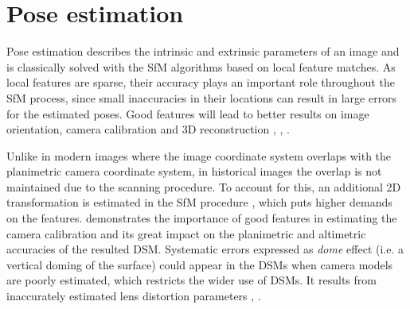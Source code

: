 \section{Pose estimation}
Pose estimation describes the intrinsic and extrinsic parameters of an image and is classically solved with the SfM algorithms \cite{snavely2006photo,deseilligny2011apero,schonberger2016structure} based on local feature matches. 
As local features are sparse, their accuracy plays an important role throughout the SfM process, since small inaccuracies in their locations can result in large errors for the estimated poses.
Good features will lead to better results on image orientation, camera calibration and 3D reconstruction \cite{lindenberger2021pixel}, \cite{sarlin2021back}, \cite{truong2018second}.

\par
Unlike in modern images where the image coordinate system overlaps with the planimetric camera coordinate system, in historical images the overlap is not maintained due to the scanning procedure. To account for this, an additional 2D transformation is estimated in the SfM procedure \cite{article}, which puts higher demands on the features. %
\cite{giordano2018toward} demonstrates the importance of good features in estimating the camera calibration and its great impact on the planimetric and altimetric accuracies of the resulted \ac{DSM}. 
Systematic errors expressed as \textit{dome} effect (i.e. a vertical doming of the surface) could appear in the \ac{DSM}s when camera models are poorly estimated, which restricts the wider use of \ac{DSM}s. It results from inaccurately estimated lens distortion parameters \cite{wackrow2008minimising}, \cite{james2014mitigating}.




